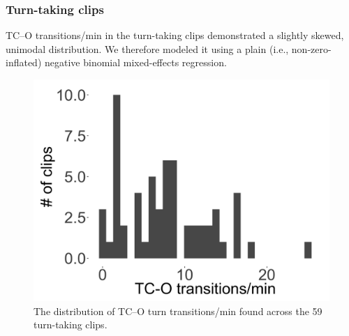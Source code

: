 \documentclass[floatsintext,man]{apa6}
\theoremstyle{definition}
\theoremstyle{definition}
\theoremstyle{definition}
\theoremstyle{remark}
\begin{document}
\FloatBarrier

\subsubsection{Turn-taking clips}\label{models-tc_o-turntaking}

TC--O transitions/min in the turn-taking clips demonstrated a slightly
skewed, unimodal distribution. We therefore modeled it using a plain
(i.e., non-zero-inflated) negative binomial mixed-effects regression.

\FloatBarrier

\begin{figure}[H]

{\centering \includegraphics[width=0.4\linewidth]{www/c_o_tpm_turntaking_distribution} 

}

\caption{The distribution of TC--O turn transitions/min found across the 59 turn-taking clips.}\label{fig:fig16}
\end{figure}

\FloatBarrier
\end{document}
